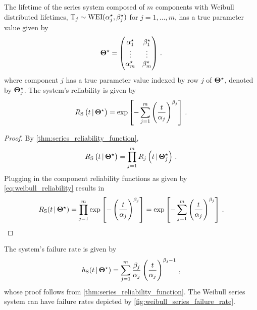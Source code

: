 \documentclass[
    11pt,
    extrafontsizes,
    article,
    oldfontcommands,
    final,
    oneside,
    openany,
    hidelinks]{memoir}
\begin{document}
The lifetime of the series system composed of $m$ components with Weibull distributed lifetimes, $\mathrm{T}_j \sim \text{WEI}({\alpha}^{\star}_j, {\beta}^{\star}_j)$ for $j=1,\ldots,m$, has a true parameter value given by
\begin{equation}
    {\boldsymbol{\Theta}}^{\star} =
    \left(
    \begin{matrix}
        {\alpha}^{\star}_1 & {\beta}^{\star}_1\\
        \vdots & \vdots\\
        {\alpha}^{\star}_m & {\beta}^{\star}_m
    \end{matrix}
    \right)\,.
\end{equation}
where component $j$ has a true parameter value indexed by row $j$ of ${\boldsymbol{\Theta}}^{\star}$, denoted by ${\boldsymbol{\Theta}}^{\star}_j$. The system's reliability is given by
\begin{equation}
\label{eq:sys_weibull_reliability_function}
    R_{\mathrm{S}} \left(t {\,|\,} {\boldsymbol{\Theta}}^{\star} \right)
    = \exp \left[-\sum_{j=1}^{m} \left( \frac{t}{\alpha_j}\right)^{\beta_j} \right]\,.
\end{equation}
\begin{proof}
By \cref{thm:series_reliability_function},
\begin{equation}
    R_{\mathrm{S}} \left(t {\,|\,} {\boldsymbol{\Theta}}^{\star}\right) = \prod_{j=1}^{m} R_j \left(t {\,|\,} {\boldsymbol{\Theta}}^{\star}_j \right)\,.
\end{equation}
Plugging in the component reliability functions as given by \cref{eq:weibull_reliability} results in
\begin{equation}
    R_{\mathrm{S}}(t {\,|\,} {\boldsymbol{\Theta}}^{\star}) = \prod_{j=1}^{m} \exp \left [-\left(\frac{t}{\alpha_j}\right)^{\beta_j} \right ] = \exp \left[-\sum_{j=1}^{m} \left( \frac{t}{\alpha_j}\right)^{\beta_j} \right]\,.
\end{equation}
\end{proof}
The system's failure rate is given by
\begin{equation}
\label{eq:sys_weibull_failure_rate_function}
    h_{\mathrm{S}}(t {\,|\,} {\boldsymbol{\Theta}}^{\star}) =
        \sum_{j=1}^{m} \frac{\beta_j}{\alpha_j}\left(\frac{t}{\alpha_j}\right)^{\beta_j-1}\,,
\end{equation}
whose proof follows from \cref{thm:series_reliability_function}. The Weibull series system can have failure rates depicted by \cref{fig:weibull_series_failure_rate}.
\end{document}
